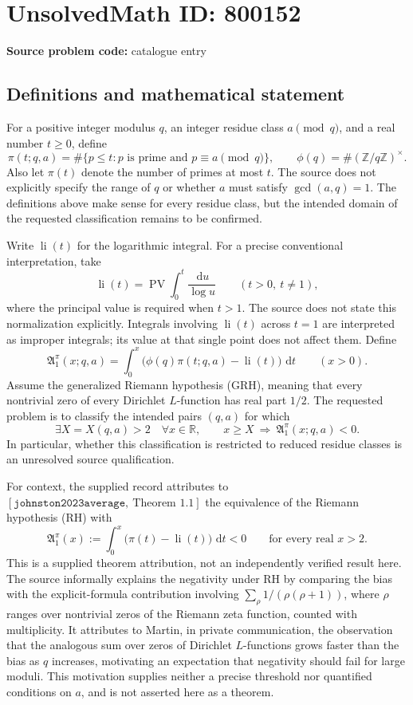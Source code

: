 \documentclass[11pt]{article}
\newcommand{\dd}{\,\mathrm{d}}
\begin{document}
\section*{UnsolvedMath ID: 800152}
\textbf{Source problem code:} catalogue entry
\subsection{Definitions and mathematical statement}
For a positive integer modulus \(q\), an integer residue class \(a\pmod q\), and a real number \(t\geq 0\), define
\[
\pi(t;q,a)=\#\{p\leq t:p\text{ is prime and }p\equiv a\pmod q\},
\qquad
\phi(q)=\#(\mathbb Z/q\mathbb Z)^\times.
\]
Also let \(\pi(t)\) denote the number of primes at most \(t\). The source does not explicitly specify the range of \(q\) or whether \(a\) must satisfy \(\gcd(a,q)=1\). The definitions above make sense for every residue class, but the intended domain of the requested classification remains to be confirmed.

Write \(\operatorname{li}(t)\) for the logarithmic integral. For a precise conventional interpretation, take
\[
\operatorname{li}(t)=\operatorname{PV}\int_0^t\frac{\dd u}{\log u}
\qquad(t>0,\ t\ne1),
\]
where the principal value is required when \(t>1\). The source does not state this normalization explicitly. Integrals involving \(\operatorname{li}(t)\) across \(t=1\) are interpreted as improper integrals; its value at that single point does not affect them. Define
\[
\mathfrak A_1^\pi(x;q,a)
=\int_0^x\bigl(\phi(q)\pi(t;q,a)-\operatorname{li}(t)\bigr)\,\dd t
\qquad(x>0).
\]
Assume the generalized Riemann hypothesis (GRH), meaning that every nontrivial zero of every Dirichlet \(L\)-function has real part \(1/2\). The requested problem is to classify the intended pairs \((q,a)\) for which
\[
\exists X=X(q,a)>2\quad\forall x\in\mathbb R,
\qquad x\geq X\ \Longrightarrow\ \mathfrak A_1^\pi(x;q,a)<0.
\]
In particular, whether this classification is restricted to reduced residue classes is an unresolved source qualification.

For context, the supplied record attributes to \([\texttt{johnston2023average},\ \text{Theorem }1.1]\) the equivalence of the Riemann hypothesis (RH) with
\[
\mathfrak A_1^\pi(x)
:=\int_0^x\bigl(\pi(t)-\operatorname{li}(t)\bigr)\,\dd t<0
\qquad\text{for every real }x>2.
\]
This is a supplied theorem attribution, not an independently verified result here. The source informally explains the negativity under RH by comparing the bias with the explicit-formula contribution involving
\(\sum_{\rho}1/(\rho(\rho+1))\), where \(\rho\) ranges over nontrivial zeros of the Riemann zeta function, counted with multiplicity. It attributes to Martin, in private communication, the observation that the analogous sum over zeros of Dirichlet \(L\)-functions grows faster than the bias as \(q\) increases, motivating an expectation that negativity should fail for large moduli. This motivation supplies neither a precise threshold nor quantified conditions on \(a\), and is not asserted here as a theorem.
\end{document}
